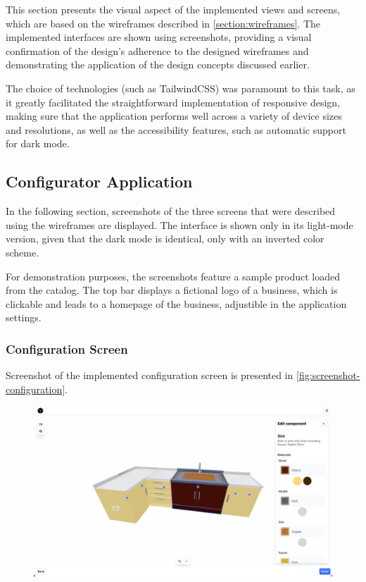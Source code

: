 This section presents the visual aspect of the implemented views and screens, which are based on the wireframes described in \autoref{section:wireframes}. The implemented interfaces are shown using screenshots, providing a visual confirmation of the design's adherence to the designed wireframes and demonstrating the application of the design concepts discussed earlier.

The choice of technologies (such as TailwindCSS) was paramount to this task, as it greatly facilitated the straightforward implementation of responsive design, making sure that the application performs well across a variety of device sizes and resolutions, as well as the accessibility features, such as automatic support for dark mode.


\subsection{Configurator Application}

In the following section, screenshots of the three screens that were described using the wireframes are displayed. The interface is shown only in its light-mode version, given that the dark mode is identical, only with an inverted color scheme.

For demonstration purposes, the screenshots feature a sample product loaded from the catalog. The top bar displays a fictional logo of a business, which is clickable and leads to a homepage of the business, adjustible in the application settings.  


\subsubsection{Configuration Screen}

Screenshot of the implemented configuration screen is presented in \autoref{fig:screenshot-configuration}.

\begin{figure}[h]
\centering
\includegraphics[width=\textwidth]{images/screenshot_configuration.png}
\label{fig:screenshot-configuration}
\end{figure}

